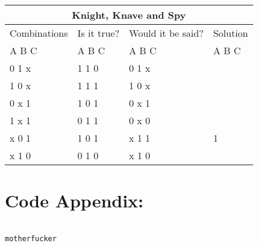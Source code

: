 \documentclass[11pt]{amsart}
\begin{document}
	\begin{tabular}{ |p{3cm}||p{3cm}|p{3cm}|p{3cm}|  }
	 \hline
	 \multicolumn{4}{|c|}{Knight, Knave and Spy} \\
	 \hline
	 Combinations & Is it true? & Would it be said? & Solution  \\ A  B  C   &   A  B  C  &   A  B  C & A  B  C \\
	 \hline
	  0   1   x  	& 1	1	0   & 0 1 x	&  \\
	  1   0   x		& 1	1	1  	& 1 0 x &  \\
	  0   x   1 	&	1	0	1 	& 0 x 1	&  \\
	  1   x   1  	&	0	1	1 	& 0 x 0	&  \\
	  x   0   1		& 1	0	1  	& x 1 1	& 1\\
	  x   1   0		& 0	1	0  	& x 1 0 &  \\

	 \hline
	\end{tabular}


\section{Code Appendix:}

\begin{verbatim}

motherfucker

\end{verbatim}
\end{document}
